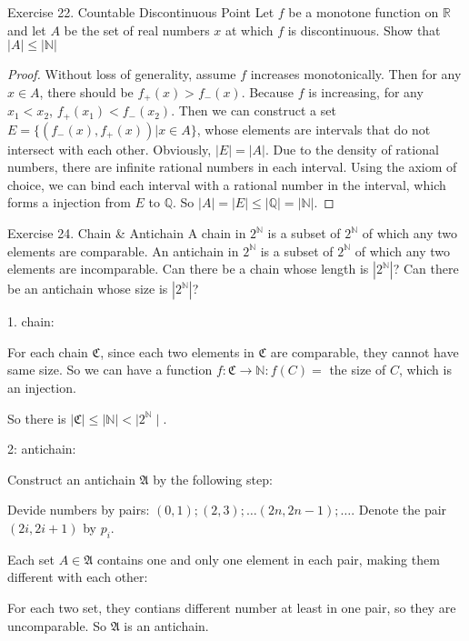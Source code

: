 \documentclass[UTF8, a4paper, linespread=1.5]{article}
\begin{document}
\begin{thm}{Exercise 22. Countable Discontinuous Point}{}
	 Let $f$ be a monotone function on $\mathbb{R}$ and let $A$ be the set of real numbers $x$ at which $f$ is discontinuous. Show that $|A| \le |\mathbb{N}|$
\end{thm}

\begin{proof}
	Without loss of generality, assume $f$ increases monotonically. Then for any $x \in A$, there should be $ f_+(x) > f_-(x)$. Because $f$ is increasing, for any $x_1 < x_2$, $ f_+(x_1) < f_-(x_2)$. Then we can construct a set $E=\{(f_-(x),f_+(x)) | x\in A\}$, whose elements are intervals that do not intersect with each other. Obviously, $|E|=|A|$. Due to the density of rational numbers, there are infinite rational numbers in each interval. Using the axiom of choice, we can bind each interval with a rational number in the interval, which forms a injection from $E$ to $\mathbb{Q}$. So $|A|=|E|\le|\mathbb{Q}|=|\mathbb{N}|$.
\end{proof}

\begin{thm}{Exercise 24. Chain \& Antichain}{}
   A chain in $2^\mathbb{N} $ is a subset of $2^\mathbb{N} $ of which any two elements are comparable. An antichain in $2^\mathbb{N} $ is a subset of $2^\mathbb{N} $ of which any two elements are incomparable. Can there be a chain whose length is $|2^\mathbb{N} |$? Can there be an antichain whose size is $|2^\mathbb{N} |$? 
\end{thm}
1. chain:

For each chain $\mathfrak C$, since each two elements in $\mathfrak C$ are comparable, they cannot have same size.
So we can have a function $f:\mathfrak C\rightarrow\mathbb N:f(C)=$ the size of $C$, which is an injection.

So there is $\mid\mathfrak C\mid\leq\mid\mathbb N\mid<\mid 2^{\mathbb N}\mid$.

2: antichain:

Construct an antichain $\mathfrak A$ by the following step:

Devide numbers by pairs: $(0, 1);(2, 3);\dots (2n, 2n - 1);\dots$. Denote the pair $(2i, 2i + 1)$ by $p_i$.

Each set $A\in\mathfrak A$ contains one and only one element in each pair, making them different with each other:

For each two set, they contians different number at least in one pair, so they are uncomparable.
So $\mathfrak A$ is an antichain.
\end{document}
